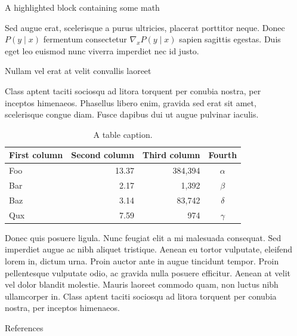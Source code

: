 \documentclass[final]{beamer}
\newlength{\sepwidth}
\newlength{\colwidth}
\newcommand{\separatorcolumn}{\begin{column}{\sepwidth}\end{column}}
\begin{document}
\begin{frame}[t]
\begin{columns}[t]
\begin{column}{\colwidth}
\begin{exampleblock}{A highlighted block containing some math}

    Sed augue erat, scelerisque a purus ultricies, placerat porttitor neque.
    Donec $P(y \mid x)$ fermentum consectetur $\nabla_x P(y \mid x)$ sapien
    sagittis egestas. Duis eget leo euismod nunc viverra imperdiet nec id
    justo.

  \end{exampleblock}

  \begin{block}{Nullam vel erat at velit convallis laoreet}

    Class aptent taciti sociosqu ad litora torquent per conubia nostra, per
    inceptos himenaeos. Phasellus libero enim, gravida sed erat sit amet,
    scelerisque congue diam. Fusce dapibus dui ut augue pulvinar iaculis.

    \begin{table}
      \centering
      \begin{tabular}{l r r c}
        \toprule
        \textbf{First column} & \textbf{Second column} & \textbf{Third column} & \textbf{Fourth} \\
        \midrule
        Foo & 13.37 & 384,394 & $\alpha$ \\
        Bar & 2.17 & 1,392 & $\beta$ \\
        Baz & 3.14 & 83,742 & $\delta$ \\
        Qux & 7.59 & 974 & $\gamma$ \\
        \bottomrule
      \end{tabular}
      \caption{A table caption.}
    \end{table}

    Donec quis posuere ligula. Nunc feugiat elit a mi malesuada consequat. Sed
    imperdiet augue ac nibh aliquet tristique. Aenean eu tortor vulputate,
    eleifend lorem in, dictum urna. Proin auctor ante in augue tincidunt
    tempor. Proin pellentesque vulputate odio, ac gravida nulla posuere
    efficitur. Aenean at velit vel dolor blandit molestie. Mauris laoreet
    commodo quam, non luctus nibh ullamcorper in. Class aptent taciti sociosqu
    ad litora torquent per conubia nostra, per inceptos himenaeos.



  \end{block}

  \begin{block}{References}

    \nocite{*}
    \footnotesize{}

  \end{block}

\end{column}

\separatorcolumn
\end{columns}
\end{frame}
\end{document}
